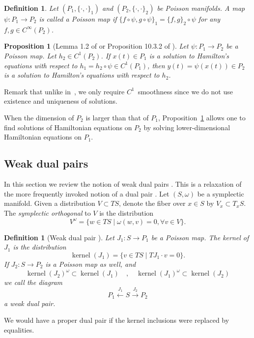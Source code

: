 \documentclass[12pt]{amsart}
\newtheorem{prop}[thm]{Proposition}
\newtheorem{defn}[thm]{Definition}
\DeclareMathOperator{\kernel}{kernel}
\begin{document}
\begin{defn}
  Let $(P_1, \{ \cdot , \cdot \}_1)$ and $(P_2, \{ \cdot , \cdot \}_2)$
  be Poisson manifolds.
  A map $\psi:P_1 \to P_2$ is called a
  \emph{Poisson map} if $\{ f \circ \psi , g \circ \psi \}_1 = \{ f , g \}_2 \circ \psi$  for any $f,g \in C^{\infty}(P_2)$.
\end{defn}


\begin{prop}[Lemma 1.2 of \cite{Weinstein1983} or Proposition 10.3.2 of \cite{MandS}] \label{prop:Poisson_dynamics}
  Let $\psi:P_1 \to P_2$ be a Poisson map.
  Let $h_2 \in C^1(P_2)$.
  If $x(t) \in P_1$ is a solution to Hamilton's equations with respect
  to $h_1 = h_2 \circ \psi \in C^1(P_1)$, then $y(t) = \psi(x(t)) \in P_2$ is a solution
  to Hamilton's equations with respect to $h_2$.
\end{prop}

  Remark that unlike in~\cite{MandS}, we only require $C^1$~smoothness
  since we do not use existence and uniqueness of solutions.

  When the dimension of $P_2$ is larger than that of $P_1$,
  Proposition~\ref{prop:Poisson_dynamics} allows one to find solutions of
  Hamiltonian equations on $P_2$
  by solving lower-dimensional Hamiltonian equations
  on $P_1$.
  \subsection{Weak dual pairs}
  In this section we review the notion of weak dual pairs
  \cite{GayBalmazVizman2012}.
  This is a relaxation of the more frequently invoked notion of a dual pair \cite{MarsdenWeinstein1983,Weinstein1983}.
  Let $(S,\omega)$ be a symplectic manifold.
  Given a distribution $V \subset TS$, denote the fiber over
  $x \in S$ by $V_x \subset T_x S$.
  The \emph{symplectic orthogonal} to $V$ is the distribution
  \begin{equation*}
    V^\omega = \{ w \in TS \mid \omega( w , v ) = 0, \forall v \in V \}.
  \end{equation*}
  \begin{defn}[Weak dual pair \cite{GayBalmazVizman2012}]\label{def:weak_dual_pair}
  Let $J_1\colon S \to P_1$ be a Poisson map.
  The kernel of $J_1$ is the distribution
  \begin{equation*}
    \kernel(J_1) = \{ v \in TS \mid TJ_1 \cdot v  = 0 \}.
  \end{equation*}
  If $J_2\colon S \to P_2$ is a Poisson map as well, and
  \begin{equation*}
    \kernel(J_2)^\omega \subset \kernel(J_1) \quad , \quad
    \kernel(J_1)^\omega \subset \kernel(J_2)
  \end{equation*}
  we call the diagram
  \begin{equation*}
    P_1 \stackrel{J_1}{\longleftarrow} S \stackrel{J_2}{\longrightarrow} P_2
  \end{equation*}
  a \emph{weak dual pair}.
  \end{defn}
  We would have a proper dual pair if the kernel inclusions were replaced by equalities.
\end{document}
